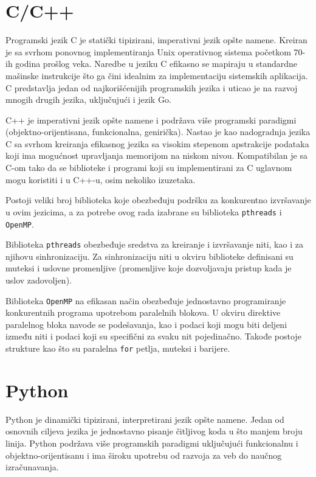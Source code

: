 \documentclass[12pt,oneside]{memoir}
\begin{document}
\section{C/C++}

Programski jezik C je statički tipizirani, imperativni jezik opšte namene. Kreiran je sa svrhom ponovnog implementiranja Unix operativnog sistema početkom 70-ih godina prošlog veka. Naredbe u jeziku C efikasno se mapiraju u standardne mašinske instrukcije što ga čini idealnim za implementaciju sistemskih aplikacija. C predstavlja jedan od najkorišćenijih programskih jezika i uticao je na razvoj mnogih drugih jezika, uključujući i jezik Go. 

C++ je imperativni jezik opšte namene i podržava više programski paradigmi (objektno-orijentisana, funkcionalna, genirička). Nastao je kao nadogradnja jezika C sa svrhom kreiranja efikasnog jezika sa visokim stepenom apstrakcije podataka koji ima mogućnost upravljanja memorijom na niskom nivou. Kompatibilan je sa C-om tako da se biblioteke i programi koji su implementirani za C uglavnom mogu koristiti i u C++-u, osim nekoliko izuzetaka.

Postoji veliki broj biblioteka koje obezbeđuju podršku za konkurentno izvršavanje u ovim jezicima, a za potrebe ovog rada izabrane su  biblioteka \texttt{pthreads} i \texttt{OpenMP}.

Biblioteka \texttt{pthreads}  \cite{pthr} obezbeđuje sredstva za kreiranje i izvršavanje niti, kao i za njihovu sinhronizaciju. Za sinhronizaciju niti u okviru biblioteke definisani su muteksi i uslovne promenljive (promenljive koje dozvoljavaju pristup kada je uslov zadovoljen). 

Biblioteka \texttt{OpenMP} \cite{omp} na efikasan način obezbeđuje jednostavno programiranje konkurentnih programa upotrebom paralelnih blokova. U okviru direktive paralelnog bloka navode se podešavanja, kao i podaci koji mogu biti deljeni između niti i podaci koji su specifični za svaku nit pojedinačno. Takođe postoje strukture kao što su paralelna \texttt{for} petlja, muteksi i barijere. 

\section{Python}

Python je dinamički tipizirani, interpretirani jezik opšte namene. Jedan od osnovnih ciljeva jezika je jednostavno pisanje čitljivog koda u što manjem broju linija. Python podržava više programskih paradigmi uključujući funkcionalnu i objektno-orijentisanu i ima široku upotrebu od razvoja za veb do naučnog izračunavanja. 
\end{document}
